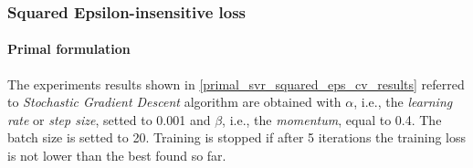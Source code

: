 \subsubsection{Squared Epsilon-insensitive loss}

\paragraph{Primal formulation}

The experiments results shown in \ref{primal_svr_squared_eps_cv_results} referred to \emph{Stochastic Gradient Descent} algorithm are obtained with $\alpha$, i.e., the \emph{learning rate} or \emph{step size}, setted to 0.001 and $\beta$, i.e., the \emph{momentum}, equal to 0.4. The batch size is setted to 20. Training is stopped if after 5 iterations the training loss is not lower than the best found so far.

